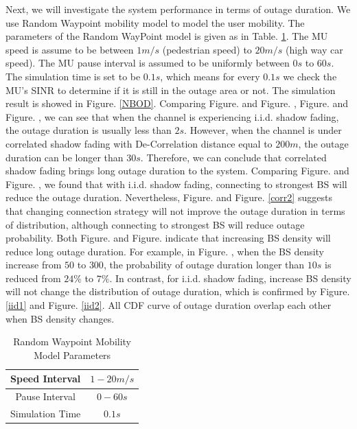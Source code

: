 \par Next, we will investigate the system performance in terms of outage duration. We use Random Waypoint mobility model to model the user mobility. The parameters of the Random WayPoint model is given as in Table. \ref{RWP}. The MU speed is assume to be between $1m/s$ (pedestrian speed) to $20m/s$ (high way car speed). The MU pause interval is assumed to be uniformly between $0s$ to $60s$. The simulation time is set to be $0.1s$, which means for every $0.1s$ we check the MU's SINR to determine if it is still in the outage area or not.  The simulation result is showed in Figure. \ref{NBOD}. Comparing Figure.  and Figure. , Figure.  and Figure. , we can see that when the channel is experiencing i.i.d. shadow fading, the outage duration is usually less than $2s$. However,  when the channel is under correlated shadow fading with De-Correlation distance equal to $200m$, the outage duration can be longer than $30s$. Therefore, we can conclude that correlated shadow fading brings long outage duration to the system. Comparing Figure.  and Figure. , we found that with i.i.d. shadow fading, connecting to strongest BS will reduce the outage duration.  Nevertheless, Figure.  and Figure. \ref{corr2} suggests that changing connection strategy will not improve the outage duration in terms of distribution, although connecting to strongest BS will reduce outage probability. Both Figure.  and Figure.  indicate that increasing BS density will reduce long outage duration. For example, in Figure. , when the BS density increase from $50$ to $300$, the probability of outage duration longer than $10s$ is reduced from $24\%$ to $7\%$. In contrast, for i.i.d. shadow fading, increase BS density will not change the distribution of outage duration, which is confirmed by Figure. \ref{iid1} and Figure. \ref{iid2}. All CDF curve of outage duration overlap each other when BS density changes. 
\begin{table}
\centering
\caption{\label{RWP}Random Waypoint Mobility Model Parameters}

\begin{tabular}{|c|c|}

\hline
Speed Interval & $1 - 20m/s$\\
\hline
Pause Interval & $0 - 60s$\\
\hline
Simulation Time & $0.1s$\\
\hline
\end{tabular}

\end{table}

